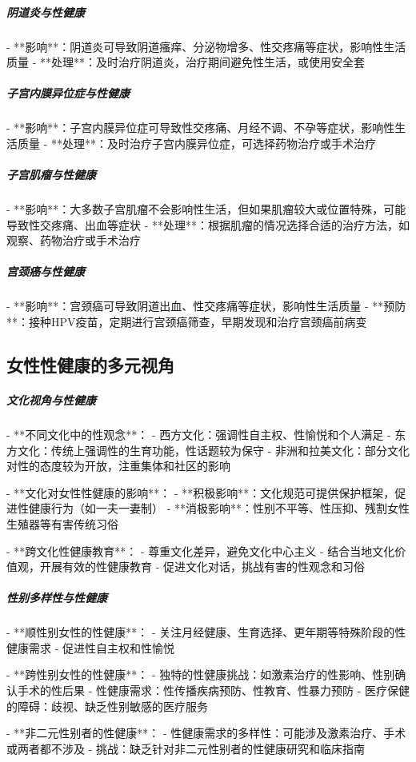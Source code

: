 \begin{enumerate}
\subparagraph{阴道炎与性健康}

- **影响**：阴道炎可导致阴道瘙痒、分泌物增多、性交疼痛等症状，影响性生活质量
- **处理**：及时治疗阴道炎，治疗期间避免性生活，或使用安全套

\subparagraph{子宫内膜异位症与性健康}

- **影响**：子宫内膜异位症可导致性交疼痛、月经不调、不孕等症状，影响性生活质量
- **处理**：及时治疗子宫内膜异位症，可选择药物治疗或手术治疗

\subparagraph{子宫肌瘤与性健康}

- **影响**：大多数子宫肌瘤不会影响性生活，但如果肌瘤较大或位置特殊，可能导致性交疼痛、出血等症状
- **处理**：根据肌瘤的情况选择合适的治疗方法，如观察、药物治疗或手术治疗

\subparagraph{宫颈癌与性健康}

- **影响**：宫颈癌可导致阴道出血、性交疼痛等症状，影响性生活质量
- **预防**：接种HPV疫苗，定期进行宫颈癌筛查，早期发现和治疗宫颈癌前病变

\subsection{女性性健康的多元视角}

\subparagraph{文化视角与性健康}

- **不同文化中的性观念**：
  - 西方文化：强调性自主权、性愉悦和个人满足
  - 东方文化：传统上强调性的生育功能，性话题较为保守
  - 非洲和拉美文化：部分文化对性的态度较为开放，注重集体和社区的影响

- **文化对女性性健康的影响**：
  - **积极影响**：文化规范可提供保护框架，促进性健康行为（如一夫一妻制）
  - **消极影响**：性别不平等、性压抑、残割女性生殖器等有害传统习俗

- **跨文化性健康教育**：
  - 尊重文化差异，避免文化中心主义
  - 结合当地文化价值观，开展有效的性健康教育
  - 促进文化对话，挑战有害的性观念和习俗

\subparagraph{性别多样性与性健康}

- **顺性别女性的性健康**：
  - 关注月经健康、生育选择、更年期等特殊阶段的性健康需求
  - 促进性自主权和性愉悦

- **跨性别女性的性健康**：
  - 独特的性健康挑战：如激素治疗的性影响、性别确认手术的性后果
  - 性健康需求：性传播疾病预防、性教育、性暴力预防
  - 医疗保健的障碍：歧视、缺乏性别敏感的医疗服务

- **非二元性别者的性健康**：
  - 性健康需求的多样性：可能涉及激素治疗、手术或两者都不涉及
  - 挑战：缺乏针对非二元性别者的性健康研究和临床指南


\end{enumerate}
